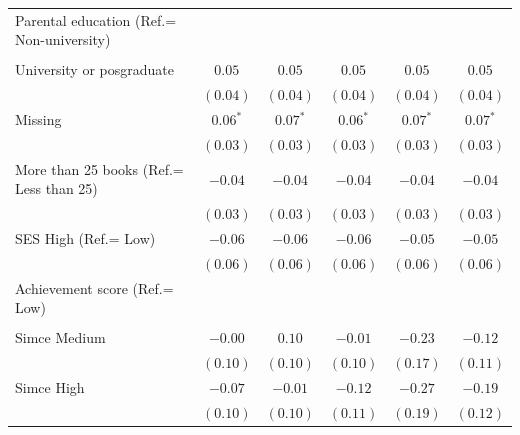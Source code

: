 \documentclass[
  12pt,
  letterpaper,
]{article}
\begin{document}
\begin{table}
{\begin{center}
{\begin{threeparttable}
\begin{tabular}{l c c c c c}
Parental education (Ref.= Non-university) &               &               &               &               &               \\
                                          &               &               &               &               &               \\
\quad University or posgraduate           & $0.05$        & $0.05$        & $0.05$        & $0.05$        & $0.05$        \\
                                          & $(0.04)$      & $(0.04)$      & $(0.04)$      & $(0.04)$      & $(0.04)$      \\
\quad Missing                             & $0.06^{*}$    & $0.07^{*}$    & $0.06^{*}$    & $0.07^{*}$    & $0.07^{*}$    \\
                                          & $(0.03)$      & $(0.03)$      & $(0.03)$      & $(0.03)$      & $(0.03)$      \\
More than 25 books (Ref.= Less than 25)   & $-0.04$       & $-0.04$       & $-0.04$       & $-0.04$       & $-0.04$       \\
                                          & $(0.03)$      & $(0.03)$      & $(0.03)$      & $(0.03)$      & $(0.03)$      \\
SES High (Ref.= Low)                      & $-0.06$       & $-0.06$       & $-0.06$       & $-0.05$       & $-0.05$       \\
                                          & $(0.06)$      & $(0.06)$      & $(0.06)$      & $(0.06)$      & $(0.06)$      \\
Achievement score (Ref.= Low)             &               &               &               &               &               \\
                                          &               &               &               &               &               \\
\quad Simce Medium                        & $-0.00$       & $0.10$        & $-0.01$       & $-0.23$       & $-0.12$       \\
                                          & $(0.10)$      & $(0.10)$      & $(0.10)$      & $(0.17)$      & $(0.11)$      \\
\quad Simce High                          & $-0.07$       & $-0.01$       & $-0.12$       & $-0.27$       & $-0.19$       \\
                                          & $(0.10)$      & $(0.10)$      & $(0.11)$      & $(0.19)$      & $(0.12)$      \\

\end{tabular}
\end{threeparttable}}
\end{center}}
\end{table}
\end{document}
